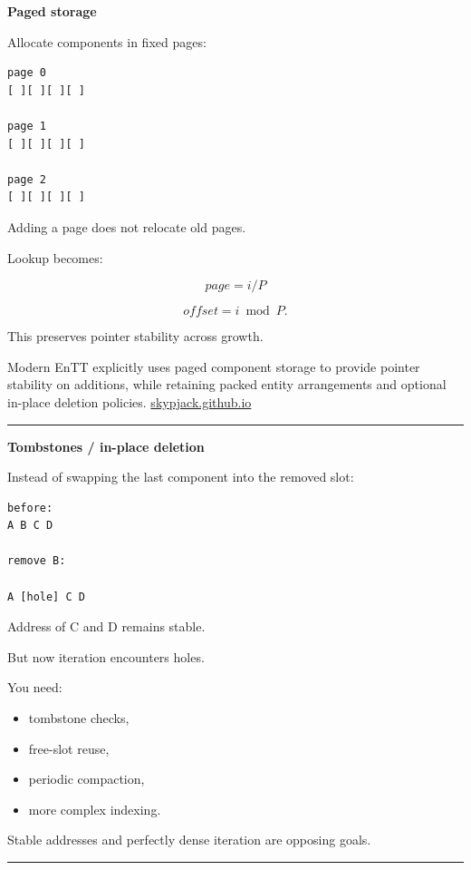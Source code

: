 \textbf{Paged storage}

Allocate components in fixed pages:

\begin{verbatim}
page 0
[ ][ ][ ][ ]

page 1
[ ][ ][ ][ ]

page 2
[ ][ ][ ][ ]
\end{verbatim}

Adding a page does not relocate old pages.

Lookup becomes:

\[
page=i/P
\]

\[
offset=i\bmod P.
\]

This preserves pointer stability across growth.

Modern EnTT explicitly uses paged component storage to provide pointer stability on additions, while retaining packed entity arrangements and optional in-place deletion policies. \href{https://skypjack.github.io/entt/md_docs_2md_2entity.html?utm_source=chatgpt.com}{skypjack.github.io}

\begin{center}\rule{0.5\linewidth}{0.5pt}\end{center}

\textbf{Tombstones / in-place deletion}

Instead of swapping the last component into the removed slot:

\begin{verbatim}
before:
A B C D

remove B:

A [hole] C D
\end{verbatim}

Address of C and D remains stable.

But now iteration encounters holes.

You need:

\begin{itemize}
\tightlist
\item
  tombstone checks,
\item
  free-slot reuse,
\item
  periodic compaction,
\item
  more complex indexing.
\end{itemize}

Stable addresses and perfectly dense iteration are opposing goals.

\begin{center}\rule{0.5\linewidth}{0.5pt}\end{center}

